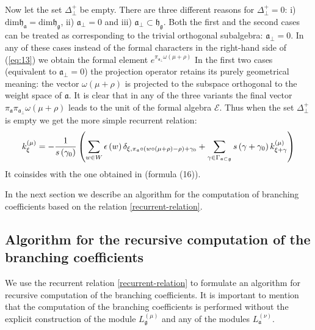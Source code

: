 \documentclass[a4paper,12pt]{article}
\theoremstyle{definition} \newtheorem{Def}{Definition}
\begin{document}
Now let the set $\Delta_{\bot}^{+}$ be empty. There are three different reasons for $\Delta_{\bot}^{+}=0$: i) $\mathrm{dim}\mathfrak{h}_{\mathfrak{a}}=\mathrm{dim}\mathfrak{h}_{\mathfrak{g}}$, ii) $\mathfrak{a}_{\bot}=0$ and iii) $\mathfrak{a}_{\bot}\subset \mathfrak{h}_{\mathfrak{g}}$. Both the first and the second cases can be treated as corresponding to the trivial orthogonal subalgebra: 
$\mathfrak{a}_{\bot}=0$. In any of these cases instead of the formal characters in the right-hand side of (\ref{eq:13}) we obtain the formal element $e^{ \pi_{\mathfrak{a}_{\bot}}\omega(\mu+\rho)}$
In the first two cases (equivalent to $\mathfrak{a}_{\bot}=0$) the projection operator retains its purely geometrical meaning: the vector $\omega(\mu+\rho)$ is projected to the subspace orthogonal to the weight space of $\mathfrak{a}$. It is clear that in any of the three variants the final vector $\pi_{\mathfrak{a}}\pi_{\mathfrak{a}_{\bot}}\omega(\mu+\rho)$ leads to the unit of the formal algebra 
$\mathcal{E}$. Thus when the set $\Delta_{\bot}^{+}$ is empty we get the more simple recurrent relation: 
\begin{equation}
k_{\xi }^{\left( \mu \right) }=-\frac{1}{s\left( \gamma _{0}\right) }\left(
\sum_{w\in W}\epsilon \left( w\right) \delta _{\xi ,\pi _{\frak{a}}\circ
\left( w\circ (\mu +\rho )-\rho \right) +\gamma _{0}}+\sum_{\gamma \in
\Gamma _{\frak{a}\subset \frak{g}}}s\left( \gamma +\gamma _{0}\right) k_{\xi
+\gamma }^{\left( \mu \right) }\right)   \label{recurrent relation special}
\end{equation}
It coinsides with the one obtained in \cite{ilyin812pbc} (formula (16)). 

  In the next section we describe an algorithm for the computation of branching coefficients based on the relation \eqref{recurrent-relation}.

\subsection{Algorithm for the recursive computation of the branching coefficients}
\label{sec:algorithm}

We use the recurrent relation \eqref{recurrent-relation} to formulate an algorithm for recursive computation of the branching coefficients. It is important to mention that the computation of the branching coefficients is performed without the  explicit construction of the module $L^{(\mu)}_{\mathfrak{g}}$ and any of the modules $L^{(\nu)}_{\mathfrak{a}}$.
\end{document}

